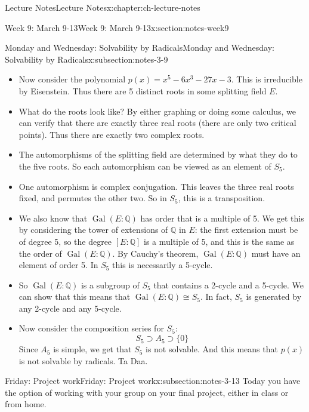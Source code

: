 \documentclass[oneside,11pt,]{book}
\begin{document}
\begin{chapterptx}{Lecture Notes}{}{Lecture Notes}{}{}{x:chapter:ch-lecture-notes}
\begin{sectionptx}{Week 9: March 9-13}{}{Week 9: March 9-13}{}{}{x:section:notes-week9}
\begin{subsectionptx}{Monday and Wednesday: Solvability by Radicals}{}{Monday and Wednesday: Solvability by Radicals}{}{}{x:subsection:notes-3-9}
\begin{itemize}[label=\textbullet]
\item{}Now consider the polynomial \(p(x) = x^5 - 6x^3 - 27x - 3\). This is irreducible by Eisenstein. Thus there are 5 distinct roots in some splitting field \(E\).%
\item{}What do the roots look like? By either graphing or doing some calculus, we can verify that there are exactly three real roots (there are only two critical points). Thus there are exactly two complex roots.%
\item{}The automorphisms of the splitting field are determined by what they do to the five roots. So each automorphism can be viewed as an element of \(S_5\).%
\item{}One automorphism is complex conjugation. This leaves the three real roots fixed, and permutes the other two. So in \(S_5\), this is a transposition.%
\item{}We also know that \(\mathop{\mathrm{Gal}}(E:\mathbb Q)\) has order that is a multiple of 5. We get this by considering the tower of extensions of \(\mathbb Q\) in \(E\): the first extension must be of degree 5, so the degree \([E:\mathbb Q]\) is a multiple of 5, and this is the same as the order of \(\mathop{\mathrm{Gal}}(E:\mathbb Q)\). By Cauchy’s theorem, \(\mathop{\mathrm{Gal}}(E:\mathbb Q)\) must have an element of order 5. In \(S_5\) this is necessarily a 5-cycle.%
\item{}So \(\mathop{\mathrm{Gal}}(E:\mathbb Q)\) is a subgroup of \(S_5\) that contains a 2-cycle and a 5-cycle. We can show that this means that \(\mathop{\mathrm{Gal}}(E:\mathbb Q) \cong S_5\). In fact, \(S_5\) is generated by any 2-cycle and any 5-cycle.%
\item{}Now consider the composition series for \(S_5\):%
\begin{equation*}
S_5 \supset A_5 \supset \{0\}
\end{equation*}
Since \(A_5\) is simple, we get that \(S_5\) is not solvable. And this means that \(p(x)\) is not solvable by radicals. Ta Daa.%
\end{itemize}
%
\end{subsectionptx}
%
%
\typeout{************************************************}
\typeout{************************************************}
%
\begin{subsectionptx}{Friday: Project work}{}{Friday: Project work}{}{}{x:subsection:notes-3-13}
Today you have the option of working with your group on your final project, either in class or from home.%
\end{subsectionptx}

\end{sectionptx}
\end{chapterptx}
\end{document}
